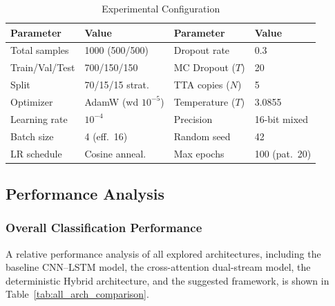 \documentclass[conference]{IEEEtran}
\begin{document}
\begin{table}[tb]
\centering
\caption{Experimental Configuration}
\label{tab:exp_config}
\footnotesize
\setlength{\tabcolsep}{3pt}
\renewcommand{\arraystretch}{1.1}
\begin{tabular}{llll}
\hline
\textbf{Parameter} & \textbf{Value} & \textbf{Parameter} & \textbf{Value} \\
\hline
Total samples      & 1000 (500/500) & Dropout rate       & 0.3 \\
Train/Val/Test     & 700/150/150    & MC Dropout ($T$)   & 20 \\
Split              & 70/15/15 strat.& TTA copies ($N$)   & 5 \\
Optimizer          & AdamW (wd $10^{-5}$) & Temperature ($T$) & 3.0855 \\
Learning rate      & $10^{-4}$      & Precision          & 16-bit mixed \\
Batch size         & 4 (eff.\ 16)   & Random seed        & 42 \\
LR schedule        & Cosine anneal. & Max epochs         & 100 (pat.\ 20) \\
\hline
\end{tabular}
\end{table}

\subsection{Performance Analysis}

\subsubsection{Overall Classification Performance}

A relative performance analysis of all explored architectures, including the baseline CNN–LSTM model, the cross-attention dual-stream model, the deterministic Hybrid architecture, and the suggested framework, is shown in Table~\ref{tab:all_arch_comparison}.

\begin{table}[tb]
\centering
\caption{Performance Comparison Across All Architectures}
\label{tab:all_arch_comparison}
\footnotesize
{}
\end{table}
\end{document}

